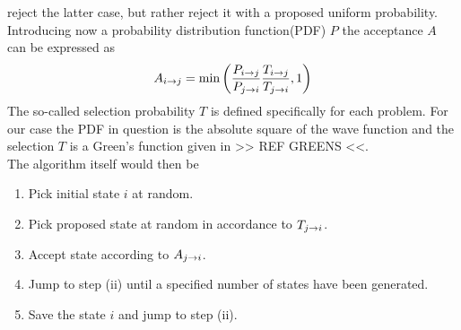         reject the latter case, but rather reject it with a proposed uniform
        probability. Introducing now a probability distribution function(PDF) $P$
        the acceptance $A$ can be expressed as
            \begin{equation}
                A_{i\rightarrow j} =
                \text{min}\left(\frac{P_{i\rightarrow j}}{P_{j\rightarrow i}}
                \frac{T_{i\rightarrow j}}{T_{j\rightarrow i}} ,1\right)
                \label{eq:metropolisAcceptance}
            \end{equation}
        The so-called selection probability $T$ is defined specifically for
        each problem. For our case the PDF in question is the absolute square
        of the wave function and the selection $T$ is a Green's function given
        in >> REF GREENS <<. \\
        The algorithm itself would then be
            \begin{enumerate}[label=(\roman*)]
                \item Pick initial state $i$ at random.
                \item Pick proposed state at random in accordance to
                    $T_{j\rightarrow i}$.
                \item Accept state according to $A_{j\rightarrow i}$.
                \item Jump to step (ii) until a specified number of states have
                    been generated.
                \item Save the state $i$ and jump to step (ii).
            \end{enumerate}
